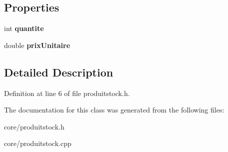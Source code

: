 \subsection*{Properties}
\begin{DoxyCompactItemize}
\item 
\hypertarget{class_produit_stock_a9517bc13bd5b4f149ff9bf1d9e8af0b8}{
int {\bfseries quantite}}
\label{class_produit_stock_a9517bc13bd5b4f149ff9bf1d9e8af0b8}

\item 
\hypertarget{class_produit_stock_a1f7eb27df3c11200869864cb21a4bba2}{
double {\bfseries prixUnitaire}}
\label{class_produit_stock_a1f7eb27df3c11200869864cb21a4bba2}

\end{DoxyCompactItemize}


\subsection{Detailed Description}


Definition at line 6 of file produitstock.h.



The documentation for this class was generated from the following files:\begin{DoxyCompactItemize}
\item 
core/produitstock.h\item 
core/produitstock.cpp\end{DoxyCompactItemize}
